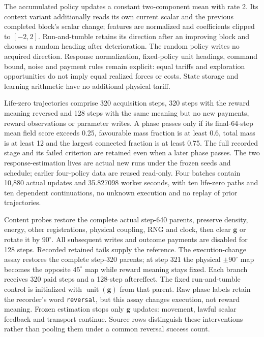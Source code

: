 The accumulated policy updates a constant two-component mean with rate 2. Its context variant additionally reads its own current scalar and the previous completed block's scalar change; features are normalized and coefficients clipped to $[-2,2]$. Run-and-tumble retains its direction after an improving block and chooses a random heading after deterioration. The random policy writes no acquired direction. Response normalization, fixed-policy unit headings, command bound, noise and payment rules remain explicit: equal tariffs and exploration opportunities do not imply equal realized forces or costs. State storage and learning arithmetic have no additional physical tariff.

Life-zero trajectories comprise 320 acquisition steps, 320 steps with the reward meaning reversed and 128 steps with the same meaning but no new payments, reward observations or parameter writes. A phase passes only if its final-64-step mean field score exceeds 0.25, favourable mass fraction is at least 0.6, total mass is at least 12 and the largest connected fraction is at least 0.75. The full recorded stage and its failed criterion are retained even when a later phase passes. The two response-estimation lives are actual new runs under the frozen seeds and schedule; earlier four-policy data are reused read-only. Four batches contain 10,880 actual updates and 35.827098 worker seconds, with ten life-zero paths and ten dependent continuations, no unknown execution and no replay of prior trajectories.

Content probes restore the complete actual step-640 parents, preserve density, energy, other registrations, physical coupling, RNG and clock, then clear $\boldsymbol g$ or rotate it by $90^\circ$. All subsequent writes and outcome payments are disabled for 128 steps. Recorded retained tails supply the reference. The execution-change assay restores the complete step-320 parents; at step 321 the physical $\pm90^\circ$ map becomes the opposite $45^\circ$ map while reward meaning stays fixed. Each branch receives 320 paid steps and a 128-step aftereffect. The fixed run-and-tumble control is initialized with $\operatorname{unit}(\boldsymbol g)$ from that parent. Raw phase labels retain the recorder's word \texttt{reversal}, but this assay changes execution, not reward meaning. Frozen estimation stops only $\boldsymbol g$ updates: movement, lawful scalar feedback and transport continue. Source rows distinguish these interventions rather than pooling them under a common reversal success count.

